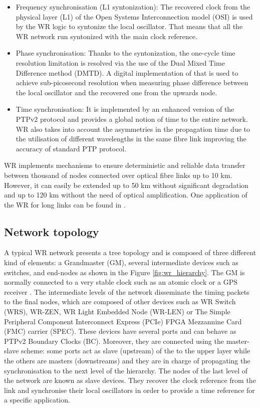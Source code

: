 \begin{itemize}
	
	\item Frequency synchronisation (L1 syntonization): The recovered clock from the physical layer (L1) of the Open Systems Interconnection model (OSI) is used by 
	the WR logic to syntonize the local oscillator. That means that all the WR network run syntonized with the main clock reference.
	
	\item Phase synchronisation: Thanks to the syntonization, the one-cycle time resolution limitation is resolved via the use of the Dual Mixed Time Difference method (DMTD). A digital implementation of that \cite{Moreira2011} is used to achieve sub-picosecond resolution when measuring phase difference between the local oscillator and the recovered one from the upwards node.
	
	\item Time synchronisation: It is implemented by an enhanced version of the PTPv2 protocol and provides a global notion of time to the entire network. WR 
	also takes into account the asymmetries in the propagation time due to the utilisation of different wavelengths in the same fibre link improving the 
	accuracy of standard PTP protocol. 
\end{itemize}

WR implements mechanisms to ensure deterministic and reliable data transfer between thousand of nodes connected over optical fibre links up to 10 km.
However, it can easily be extended up to 50 km without significant degradation and up to 120 km without the need of optical amplification. One application of the WR for long links can be found in \cite{Kaur2017}.

\subsection{Network topology} \label{subsec:wr-net}

A typical WR network presents a tree topology and is composed of three different
kind of elements: a Grandmaster (GM), several intermediate devices such as
switches, and end-nodes as shown in the Figure \ref{fig:wr_hierarchy}. The GM
is normally connected to a very stable clock such as an atomic clock or a GPS
receiver \cite{Daniluk2012}. The intermediate levels of the network disseminate
the timing packets to the final nodes, which are composed of other devices such
as WR Switch (WRS), WR-ZEN, WR Light Embedded Node (WR-LEN) or The Simple Peripheral Component Interconnect Express (PCIe) FPGA Mezzannine Card (FMC) carrier (SPEC). These devices have several ports and can behave as PTPv2 Boundary Clocks (BC). Moreover, they are connected using the master-slave scheme: some ports act as slave (upstream) of the to the upper layer while the others are masters (downstreams) and they are in charge of propagating the synchronisation to the next level of the hierarchy. The nodes of the last level of the network are known as slave devices. They recover the clock reference from the link and synchronise their local oscillators in order to provide a time reference for a specific application.

